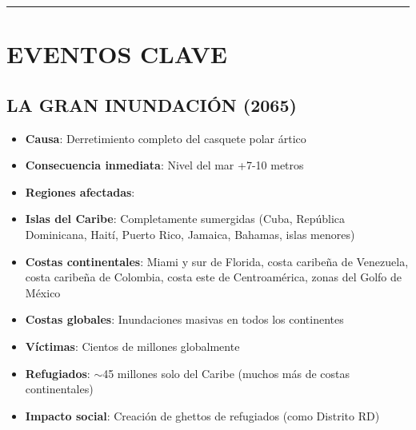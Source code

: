 \documentclass[11pt,a4paper]{report}
\begin{document}
\bigskip\hrule\bigskip

\section{EVENTOS CLAVE}

\subsection{LA GRAN INUNDACIÓN (2065)}
\begin{itemize}
  \item \textbf{Causa}: Derretimiento completo del casquete polar ártico
  \item \textbf{Consecuencia inmediata}: Nivel del mar +7-10 metros
  \item \textbf{Regiones afectadas}: 
  \item \textbf{Islas del Caribe}: Completamente sumergidas (Cuba, República Dominicana, Haití, Puerto Rico, Jamaica, Bahamas, islas menores)
  \item \textbf{Costas continentales}: Miami y sur de Florida, costa caribeña de Venezuela, costa caribeña de Colombia, costa este de Centroamérica, zonas del Golfo de México
  \item \textbf{Costas globales}: Inundaciones masivas en todos los continentes
  \item \textbf{Víctimas}: Cientos de millones globalmente
  \item \textbf{Refugiados}: $\sim$45 millones solo del Caribe (muchos más de costas continentales)
  \item \textbf{Impacto social}: Creación de ghettos de refugiados (como Distrito RD)

\end{itemize}
\end{document}
